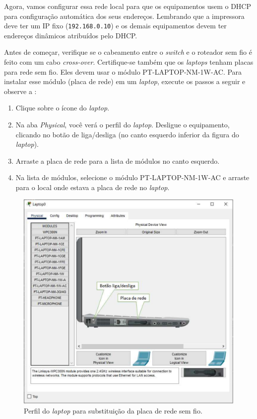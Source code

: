 Agora, vamos configurar essa rede local para que os equipamentos usem o DHCP para configuração automática dos seus endereços. Lembrando que  a impressora deve ter um IP fixo (\texttt{192.168.0.10}) e os demais equipamentos devem ter endereços dinâmicos atribuídos pelo DHCP.

Antes de começar, verifique se o cabeamento entre o \textit{switch} e o roteador sem fio é feito com um cabo \textit{cross-over}. Certifique-se também que os \textit{laptops} tenham placas para rede sem fio. Eles devem usar o módulo PT-LAPTOP-NM-1W-AC. Para instalar esse módulo (placa de rede) em um \textit{laptop}, execute os passos a seguir e observe a :

\begin{enumerate}[label*=\arabic*.]
  \item Clique sobre o ícone do \textit{laptop}.
  \item Na aba \textit{Physical}, você verá o perfil do \textit{laptop}. Desligue o equipamento, clicando no botão de liga/desliga (no canto esquerdo inferior da figura do \textit{laptop}).
  \item Arraste a placa de rede para a lista de módulos no canto esquerdo.
  \item Na lista de módulos, selecione o módulo PT-LAPTOP-NM-1W-AC e arraste para o local onde estava a placa de rede no \textit{laptop}.
\end{enumerate}

\begin{figure}[!hbt]
    \centering
    \includegraphics[scale=.8]{Figuras/PerfilLaptop}
    \caption{Perfil do \textit{laptop} para substituição da placa de rede sem fio.}\label{fig:perfilLaptop}
\end{figure}

